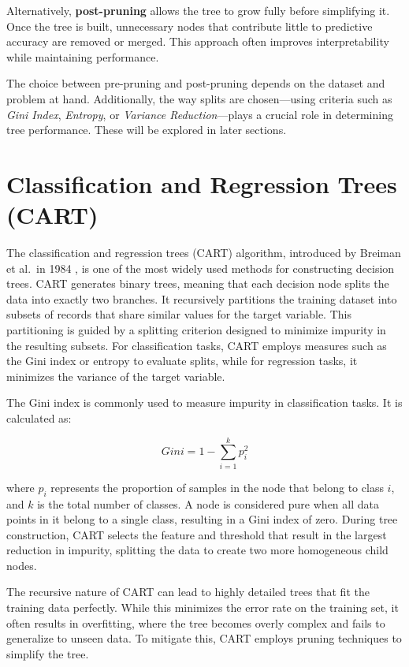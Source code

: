 \documentclass[
]{book}
\theoremstyle{definition}
\theoremstyle{definition}
\theoremstyle{definition}
\theoremstyle{definition}
\theoremstyle{remark}
\begin{document}
Alternatively, \textbf{post-pruning} allows the tree to grow fully before simplifying it. Once the tree is built, unnecessary nodes that contribute little to predictive accuracy are removed or merged. This approach often improves interpretability while maintaining performance.

The choice between pre-pruning and post-pruning depends on the dataset and problem at hand. Additionally, the way splits are chosen---using criteria such as \emph{Gini Index}, \emph{Entropy}, or \emph{Variance Reduction}---plays a crucial role in determining tree performance. These will be explored in later sections.

\section{Classification and Regression Trees (CART)}\label{classification-and-regression-trees-cart}

The classification and regression trees (CART) algorithm, introduced by Breiman et al.~in 1984 \citep{breiman1984classification}, is one of the most widely used methods for constructing decision trees. CART generates binary trees, meaning that each decision node splits the data into exactly two branches. It recursively partitions the training dataset into subsets of records that share similar values for the target variable. This partitioning is guided by a splitting criterion designed to minimize impurity in the resulting subsets. For classification tasks, CART employs measures such as the Gini index or entropy to evaluate splits, while for regression tasks, it minimizes the variance of the target variable.

The Gini index is commonly used to measure impurity in classification tasks. It is calculated as:

\[
Gini = 1 - \sum_{i=1}^k p_i^2
\]

where \(p_i\) represents the proportion of samples in the node that belong to class \(i\), and \(k\) is the total number of classes. A node is considered pure when all data points in it belong to a single class, resulting in a Gini index of zero. During tree construction, CART selects the feature and threshold that result in the largest reduction in impurity, splitting the data to create two more homogeneous child nodes.

The recursive nature of CART can lead to highly detailed trees that fit the training data perfectly. While this minimizes the error rate on the training set, it often results in overfitting, where the tree becomes overly complex and fails to generalize to unseen data. To mitigate this, CART employs pruning techniques to simplify the tree.
\end{document}
